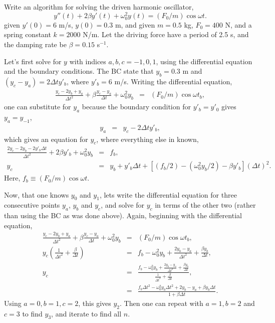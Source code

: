 \example

Write an algorithm for solving the driven harmonic oscillator,
\[
y''(t)+2\beta y'(t)+\omega_0^2 y(t)=(F_0/m)\cos\omega t.
\]
given $y'(0)=6$ m/s, $y(0)=0.3$ m, and given $m=0.5$ kg, $F_0=400$ N,
and a spring constant $k=2000$ N/m. Let the driving force have a
period of 2.5 s, and the damping rate be $\beta=0.15$ s$^{-1}$.

Let's first solve for $y$ with indices $a,b,c=-1,0,1$, using the
differential equation and the boundary conditions. The BC state that
$y_b=0.3$ m and $(y_c-y_a)=2\Delta t y'_b$, where $y'_b=6$
m/s. Writing the differential equation,
\begin{eqnarray*}
\frac{y_c-2y_b+y_a}{\Delta t^2}+\beta\frac{y_c-y_a}{\Delta
  t}+\omega_0^2 y_b&=&(F_0/m)\cos\omega t_b,
\end{eqnarray*}
one can substitute for $y_a$ because the boundary condition for
$y'_b=y'_0$ gives $y_a=y_{-1}$,
\begin{eqnarray*}
y_a&=&y_c-2\Delta ty'_b,
\end{eqnarray*}
which gives an equation for $y_c$, where everything else in known,
\begin{eqnarray*}
\frac{2y_c-2y_b-2y'_b\Delta t}{\Delta t^2}+2\beta
y'_b+\omega_0^2y_b&=&f_b,\\ \nonumber y_c&=&y_b+y'_b\Delta
t+\left[(f_b/2)-(\omega_0^2y_b/2)-\beta y'_b\right](\Delta t)^2.
\end{eqnarray*}
Here, $f_b\equiv (F_0/m)\cos\omega t$.

Now, that one knows $y_0$ and $y_1$, lets write the differential
equation for three consecutive points $y_a$, $y_b$ and $y_c$, and
solve for $y_c$ in terms of the other two (rather than using the BC as
was done above). Again, beginning with the differential equation,
\begin{eqnarray*}
\frac{y_c-2y_b+y_a}{\Delta t^2}+\beta\frac{y_c-y_a}{\Delta
  t}+\omega_0^2 y_b&=&(F_0/m)\cos\omega
t_b,\\ y_c\left(\frac{1}{\Delta t^2}+\frac{\beta}{\Delta t}\right)
&=&f_b-\omega_0^2y_b+\frac{2y_b-y_a}{\Delta t^2}+\frac{\beta
  y_b}{\Delta
  t},\\ y_c&=&\frac{f_b-\omega_0^2y_b+\frac{2y_b-y_a}{\Delta
    t^2}+\frac{\beta y_b}{\Delta t}}{\frac{1}{\Delta
    t^2}+\frac{\beta}{\Delta t}},\\ &=&\frac{f_b\Delta
  t^2-\omega_0^2y_b\Delta t^2+2y_b-y_a+\beta y_b\Delta
  t}{1+\beta\Delta t}.
\end{eqnarray*}
Using $a=0, b=1, c=2$, this gives $y_2$. Then one can repeat with
$a=1, b=2$ and $c=3$ to find $y_3$, and iterate to find all $n$.

